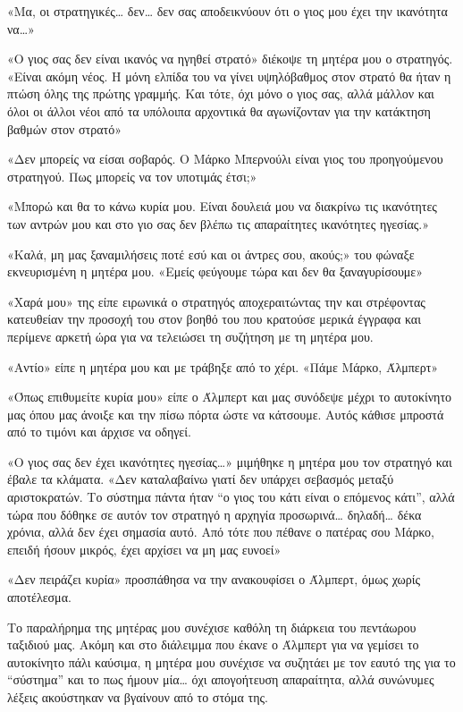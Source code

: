 \documentclass[12pt,twoside, openany]{book}
\begin{document}
«Μα, οι στρατηγικές… δεν… δεν σας αποδεικνύουν ότι ο γιος μου έχει την ικανότητα να…»

«Ο γιος σας δεν είναι ικανός να ηγηθεί στρατό» διέκοψε τη μητέρα μου ο στρατηγός. «Είναι ακόμη νέος. Η μόνη ελπίδα του να γίνει υψηλόβαθμος στον στρατό θα ήταν η πτώση όλης της πρώτης γραμμής. Και τότε, όχι μόνο ο γιος σας, αλλά μάλλον και όλοι οι άλλοι νέοι από τα υπόλοιπα αρχοντικά θα αγωνίζονταν για την κατάκτηση βαθμών στον στρατό»

«Δεν μπορείς να είσαι σοβαρός. Ο Μάρκο Μπερνούλι είναι γιος του προηγούμενου στρατηγού. Πως μπορείς να τον υποτιμάς έτσι;»

«Μπορώ και θα το κάνω κυρία μου. Είναι δουλειά μου να διακρίνω τις ικανότητες των αντρών μου και στο γιο σας δεν βλέπω τις απαραίτητες ικανότητες ηγεσίας.»

«Καλά, μη μας ξαναμιλήσεις ποτέ εσύ και οι άντρες σου, ακούς;» του φώναξε εκνευρισμένη η μητέρα μου. «Εμείς φεύγουμε τώρα και δεν θα ξαναγυρίσουμε»

«Χαρά μου» της είπε ειρωνικά ο στρατηγός αποχεραιτώντας την και στρέφοντας κατευθείαν την προσοχή του στον βοηθό του που κρατούσε μερικά έγγραφα και περίμενε αρκετή ώρα για να τελειώσει τη συζήτηση με τη μητέρα μου.

«Αντίο» είπε η μητέρα μου και με τράβηξε από το χέρι. «Πάμε Μάρκο, Άλμπερτ»

«Όπως επιθυμείτε κυρία μου» είπε ο Άλμπερτ και μας συνόδεψε μέχρι το αυτοκίνητο μας όπου μας άνοιξε και την πίσω πόρτα ώστε να κάτσουμε. Αυτός κάθισε μπροστά από το τιμόνι και άρχισε να οδηγεί. 

«Ο γιος σας δεν έχει ικανότητες ηγεσίας…» μιμήθηκε η μητέρα μου τον στρατηγό και έβαλε τα κλάματα. «Δεν καταλαβαίνω γιατί δεν υπάρχει σεβασμός μεταξύ αριστοκρατών. Το σύστημα πάντα ήταν “ο γιος του κάτι είναι ο επόμενος κάτι”, αλλά τώρα που δόθηκε σε  αυτόν τον στρατηγό η αρχηγία προσωρινά… δηλαδή… δέκα χρόνια, αλλά δεν έχει σημασία αυτό. Από τότε που πέθανε ο πατέρας σου Μάρκο, επειδή ήσουν μικρός, έχει αρχίσει να μη μας ευνοεί»

«Δεν πειράζει κυρία» προσπάθησα να την ανακουφίσει ο Άλμπερτ, όμως χωρίς αποτέλεσμα.

Το παραλήρημα της μητέρας μου συνέχισε καθόλη τη διάρκεια του πεντάωρου ταξιδιού μας. Ακόμη και στο διάλειμμα που έκανε ο Άλμπερτ για να γεμίσει το αυτοκίνητο πάλι καύσιμα, η μητέρα μου συνέχισε να συζητάει με τον εαυτό της για το “σύστημα” και το πως ήμουν μία… όχι απογοήτευση απαραίτητα, αλλά συνώνυμες λέξεις ακούστηκαν να βγαίνουν από το στόμα της. 
\end{document}
